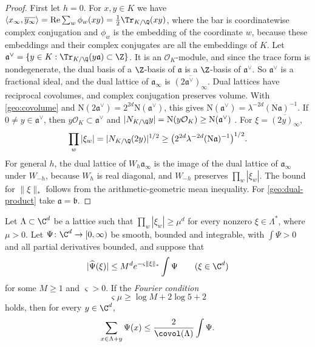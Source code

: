 \begin{proof}
First let $h=0$. For $x,y\in K$ we have
$\langle x_\infty,\overline{y_\infty}\rangle
=\operatorname{Re}\sum_w\phi_w(xy)=\tfrac12\Tr_{K/\Q}(xy)$, where the
bar is coordinatewise complex conjugation and $\phi_w$ is the
embedding of the coordinate $w$, because these embeddings and their
complex conjugates are all the embeddings of $K$. Let
$\mathfrak a^\vee=\{y\in K:\Tr_{K/\Q}(y\mathfrak a)\subset\Z\}$. It is an
$\mathcal O_K$-module, and since the trace form is nondegenerate, the
dual basis of a $\Z$-basis of $\mathfrak a$ is a $\Z$-basis of
$\mathfrak a^\vee$. So $\mathfrak a^\vee$ is a fractional ideal, and
the dual lattice of $\mathfrak a_\infty$ is
$\overline{(2\mathfrak a^\vee)_\infty}$. Dual lattices have reciprocal
covolumes, and complex conjugation preserves volume. With
\eqref{geo:covolume} and $\mathrm N(2\mathfrak a^\vee)=2^{2d}\mathrm N(\mathfrak a^\vee)$, this
gives $\mathrm N(\mathfrak a^\vee)=\lambda^{-2d}(\mathrm N\mathfrak a)^{-1}$. If
$0\ne y\in\mathfrak a^\vee$, then $y\mathcal O_K\subset\mathfrak a^\vee$
and $|N_{K/\Q}y|=\mathrm N(y\mathcal O_K)\ge \mathrm N(\mathfrak a^\vee)$
\cite[Propositions~4.1 and~4.2]{MilneANT}. For
$\xi=\overline{(2y)_\infty}$,
\[
 \prod_w|\xi_w|=|N_{K/\Q}(2y)|^{1/2}
 \ge\bigl(2^{2d}\lambda^{-2d}(\mathrm N\mathfrak a)^{-1}\bigr)^{1/2}.
\]
For general $h$, the dual lattice of $W_h\mathfrak a_\infty$ is the
image of the dual lattice of $\mathfrak a_\infty$ under $W_{-h}$,
because $W_h$ is real diagonal, and $W_{-h}$ preserves
$\prod_w|\xi_w|$. The bound for $\|\xi\|_*$ follows from the
arithmetic-geometric mean inequality. For \eqref{geo:dual-product} take
$\mathfrak a=\mathfrak b$.
\end{proof}

\begin{lemma}\label{geo:poisson}
Let $\Lambda\subset\C^d$ be a lattice such that
$\prod_w|\xi_w|\ge\mu^d$ for every nonzero $\xi\in\Lambda^*$, where
$\mu>0$. Let $\Psi\colon\C^d\to[0,\infty)$ be smooth, bounded and
integrable, with $\int\Psi>0$ and all partial derivatives bounded, and
suppose that
\[
 |\widehat\Psi(\xi)|\le M^de^{-\varsigma\|\xi\|_*}\int\Psi
 \qquad(\xi\in\C^d)
\]
for some $M\ge1$ and $\varsigma>0$. If the \emph{Fourier condition}
\begin{equation}\label{geo:poisson-condition}
 \varsigma\mu\ge\log M+2\log5+2
\end{equation}
holds, then for every $y\in\C^d$,
\begin{equation}\label{geo:pointwise-poisson}
 \sum_{x\in\Lambda+y}\Psi(x)\le\frac2{\covol(\Lambda)}\int\Psi.
\end{equation}
\end{lemma}

